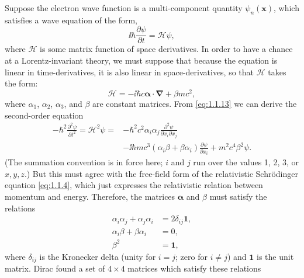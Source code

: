 Suppose the electron wave function is a multi-component quantity $\psi_n(\mathbf{x})$,
which satisfies a wave equation of the form,
\begin{equation}
  \ii\hbar\frac{\partial\psi}{\partial t}=\mathcal{H}\psi,
  \tag{1.1.13}\label{eq:1.1.13}
\end{equation}
where $\mathcal{H}$ is some matrix function of space derivatives. In order to have a
chance at a Lorentz-invariant theory, we must suppose that because the
equation is linear in time-derivatives, it is also linear in space-derivatives,
so that $\mathcal{H}$ takes the form:
\begin{equation}
  \mathcal{H}=-\ii\hbar c\boldsymbol{\alpha}\cdot\boldsymbol{\nabla}+\beta mc^2,
  \tag{1.1.14}\label{eq:1.1.14}
\end{equation}
where $\alpha_1$, $\alpha_2$, $\alpha_3$, and $\beta$ are constant matrices. From \eqref{eq:1.1.13} we can derive
the second-order equation
\begin{align*}
  -\hbar^2\frac{\partial^2\psi}{\partial t^2}
  =\mathcal{H}^2\psi
  ={}&-\hbar^2c^2\alpha_i\alpha_j
  \frac{\partial^2\psi}{\partial x_i\partial x_j}\\
  &-\ii\hbar mc^3(\alpha_i\beta+\beta\alpha_i)
  \frac{\partial\psi}{\partial x_i}
  +m^2c^4\beta^2\psi.
\end{align*}
(The summation convention is in force here; $i$ and $j$ run over the values
1, 2, 3, or $x,y,z$.) But this must agree with the free-field form of the
relativistic Schr\"odinger equation \eqref{eq:1.1.4}, which just expresses the relativistic
relation between momentum and energy. Therefore, the matrices $\boldsymbol{\alpha}$ and $\beta$
must satisfy the relations
\begin{align}
  \alpha_i\alpha_j+\alpha_j\alpha_i&=2\delta_{ij}\mathbf{1},
  \tag{1.1.15}\label{eq:1.1.15}\\
  \alpha_i\beta+\beta\alpha_i&=0,
  \tag{1.1.16}\label{eq:1.1.16}\\
  \beta^2&=\mathbf{1},
  \tag{1.1.17}\label{eq:1.1.17}
\end{align}
where $\delta_{ij}$ is the Kronecker delta (unity for $i=j$; zero for $i\neq j$) and $\mathbf{1}$ is
the unit matrix. Dirac found a set of $4\times4$ matrices which satisfy these
relations
